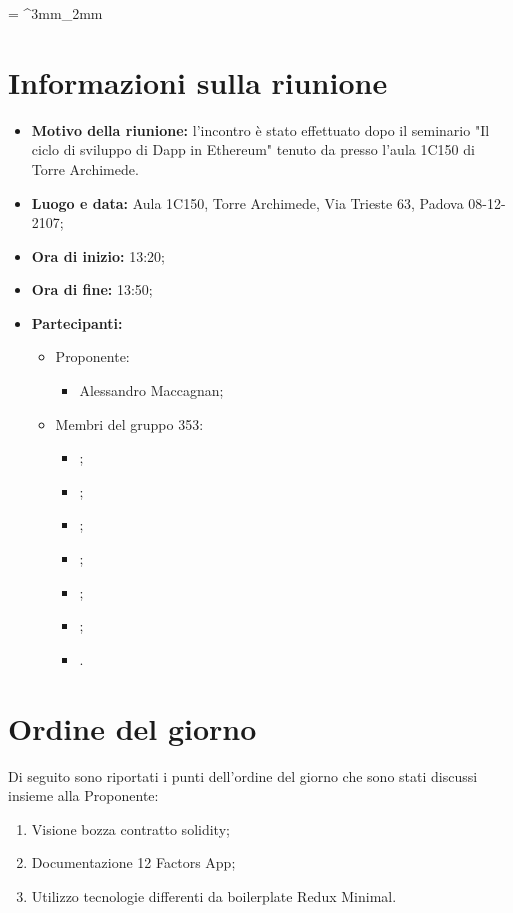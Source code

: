 \documentclass[VER-2018-01-09.tex]{subfiles}
\begin{document}
\tabulinesep = ^3mm_2mm
\chapter{Informazioni sulla riunione}
\begin{itemize}
	\item \textbf{Motivo della riunione:} l'incontro è stato effettuato dopo il seminario "Il ciclo di sviluppo di Dapp in Ethereum" tenuto da \Proponente presso l'aula 1C150 di Torre Archimede.

	\item \textbf{Luogo e data:} Aula 1C150, Torre Archimede, Via Trieste 63, Padova 08-12-2107;
	\item \textbf{Ora di inizio:} 13:20;
	\item \textbf{Ora di fine:} 13:50;
	\item \textbf{Partecipanti:}
	\begin{itemize}
		\item Proponente:
		\begin{itemize}
			\item Alessandro Maccagnan;
		\end{itemize}
		\item Membri del gruppo 353:
		\begin{itemize}
			\item \Davide;
			\item \Elena;
			\item \Gianluca;
			\item \Mirco;
			\item \Parwinder;
			\item \Riccardo;
			\item \Valentina.
		\end{itemize}
	\end{itemize}
\end{itemize}
\chapter{Ordine del giorno}	
Di seguito sono riportati i punti dell'ordine del giorno che sono stati discussi insieme alla Proponente:
\begin{enumerate}
	\item Visione bozza contratto solidity; 
	\item Documentazione 12 Factors App;
	\item Utilizzo tecnologie differenti da boilerplate Redux Minimal.
\end{enumerate}
\end{document}
